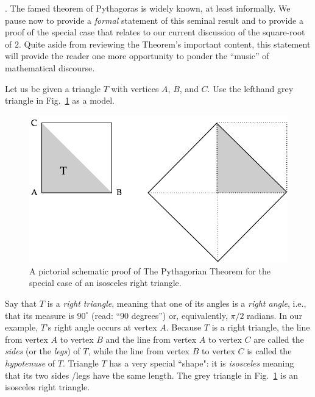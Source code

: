 \bigskip


.
The famed theorem of Pythagoras is widely known, at least informally.  We pause now to provide a {\em formal} statement of this seminal result and to provide a proof of the special case that relates to our current discussion of the square-root of $2$.  Quite aside from reviewing the Theorem's important content, this statement will provide the reader one more opportunity to ponder the ``music'' of mathematical discourse.

\medskip


Let us be given a triangle $T$ with vertices $A$, $B$, and $C$.  Use the lefthand grey triangle in
Fig.~\ref{fig:unitsquare} as a model.
\begin{figure}[htb]
\begin{center}
       \includegraphics[scale=0.3]{FiguresArithmetic/UnitSquareSQRT2}
\caption{A pictorial schematic proof of The Pythagorian Theorem for the special case of an isosceles right triangle.
\label{fig:unitsquare}}
\end{center}
\end{figure}
Say that $T$ is a {\it right triangle}, meaning that one of its angles is a {\em right angle}, i.e., that its measure is $90^\circ$ (read: ``$90$ degrees'') or, equivalently, $\pi/2$ radians.  In our example, $T$'s right angle occurs at vertex $A$.  Because $T$ is a right triangle, the line from vertex $A$ to vertex $B$ and the line from vertex $A$ to vertex $C$ are called the {\em sides} (or the {\it legs}) of $T$, while the line from vertex $B$ to vertex $C$ is called the {\em hypotenuse} of $T$.  Triangle $T$ has a very special ``shape": it is {\em isosceles} meaning that its two sides /legs have the same length.  The grey triangle in Fig.~\ref{fig:unitsquare} is an isosceles right triangle.

